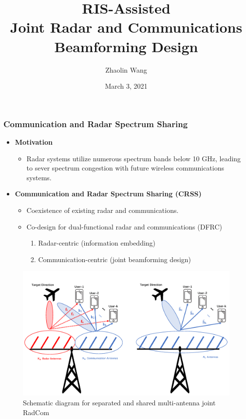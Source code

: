 \documentclass[9pt]{beamer}
\title[RIS-assisted RadCom]{RIS-Assisted\\
Joint Radar and Communications\\
Beamforming Design} %
\author{Zhaolin Wang} %
\institute[Imperial] %
{
Communications and Signal Processing Group\\ %
Department of Electrical and Electronic Engineering\\
Imperial College London
\medskip
}
\date{March 3, 2021} %
\begin{document}
\begin{frame}
\titlepage %
\end{frame}


\begin{frame}
\frametitle{Communication and Radar Spectrum Sharing}
\begin{itemize}
  \item \textbf{Motivation} 
    \begin{itemize}
      \item Radar systems utilize numerous spectrum bands below 10 GHz, leading to sever spectrum congestion with future wireless communications systems.
    \end{itemize}
  \item \textbf{Communication and Radar Spectrum Sharing (CRSS)} 
    \begin{itemize}
      \item Coexistence of existing radar and communications.
      \item Co-design for dual-functional radar and communications (DFRC)
        \begin{enumerate}
          \item Radar-centric (information embedding)
          \item Communication-centric (joint beamforming design)
        \end{enumerate}
    \end{itemize}
\end{itemize}
\begin{figure}
  \includegraphics[width=0.4\linewidth]{Fig1.png}
  \caption{Schematic diagram for separated and shared multi-antenna
  joint RadCom }
\end{figure}
\end{frame}

\end{document}

